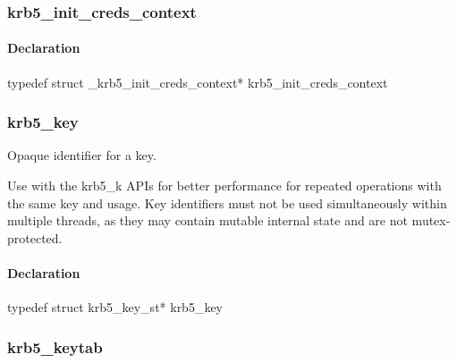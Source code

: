 \documentclass[letterpaper,10pt,english]{sphinxmanual}
\begin{document}
\subsubsection{krb5\_init\_creds\_context}
\label{appdev/refs/types/krb5_init_creds_context:krb5-init-creds-context}\label{appdev/refs/types/krb5_init_creds_context::doc}\label{appdev/refs/types/krb5_init_creds_context:krb5-init-creds-context-struct}

\begin{fulllineitems}
\label{appdev/refs/types/krb5_init_creds_context:krb5_init_creds_context}
\end{fulllineitems}



\paragraph{Declaration}
\label{appdev/refs/types/krb5_init_creds_context:declaration}
typedef struct \_krb5\_init\_creds\_context* krb5\_init\_creds\_context


\subsubsection{krb5\_key}
\label{appdev/refs/types/krb5_key::doc}\label{appdev/refs/types/krb5_key:krb5-key}\label{appdev/refs/types/krb5_key:krb5-key-struct}

\begin{fulllineitems}
\label{appdev/refs/types/krb5_key:krb5_key}
\end{fulllineitems}


Opaque identifier for a key.

Use with the krb5\_k APIs for better performance for repeated operations with the same key and usage. Key identifiers must not be used simultaneously within multiple threads, as they may contain mutable internal state and are not mutex-protected.


\paragraph{Declaration}
\label{appdev/refs/types/krb5_key:declaration}
typedef struct krb5\_key\_st* krb5\_key


\subsubsection{krb5\_keytab}
\label{appdev/refs/types/krb5_keytab:krb5-keytab}\label{appdev/refs/types/krb5_keytab::doc}\label{appdev/refs/types/krb5_keytab:krb5-keytab-struct}
\end{document}
